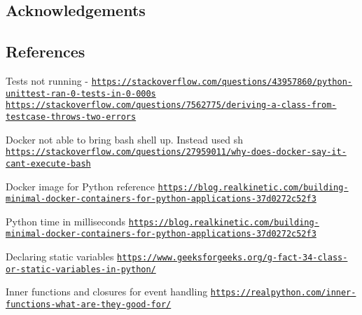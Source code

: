 \subsection*{Acknowledgements }

\subsection*{References }


\begin{DoxyEnumerate}
\item Tests not running -\/ \href{https://stackoverflow.com/questions/43957860/python-unittest-ran-0-tests-in-0-000s}{\tt https\+://stackoverflow.\+com/questions/43957860/python-\/unittest-\/ran-\/0-\/tests-\/in-\/0-\/000s} \href{https://stackoverflow.com/questions/7562775/deriving-a-class-from-testcase-throws-two-errors}{\tt https\+://stackoverflow.\+com/questions/7562775/deriving-\/a-\/class-\/from-\/testcase-\/throws-\/two-\/errors}
\item Docker not able to bring bash shell up. Instead used sh \href{https://stackoverflow.com/questions/27959011/why-does-docker-say-it-cant-execute-bash}{\tt https\+://stackoverflow.\+com/questions/27959011/why-\/does-\/docker-\/say-\/it-\/cant-\/execute-\/bash}
\item Docker image for Python reference \href{https://blog.realkinetic.com/building-minimal-docker-containers-for-python-applications-37d0272c52f3}{\tt https\+://blog.\+realkinetic.\+com/building-\/minimal-\/docker-\/containers-\/for-\/python-\/applications-\/37d0272c52f3}
\item Python time in milliseconds \href{https://blog.realkinetic.com/building-minimal-docker-containers-for-python-applications-37d0272c52f3}{\tt https\+://blog.\+realkinetic.\+com/building-\/minimal-\/docker-\/containers-\/for-\/python-\/applications-\/37d0272c52f3}
\item Declaring static variables \href{https://www.geeksforgeeks.org/g-fact-34-class-or-static-variables-in-python/}{\tt https\+://www.\+geeksforgeeks.\+org/g-\/fact-\/34-\/class-\/or-\/static-\/variables-\/in-\/python/}
\item Inner functions and closures for event handling \href{https://realpython.com/inner-functions-what-are-they-good-for/}{\tt https\+://realpython.\+com/inner-\/functions-\/what-\/are-\/they-\/good-\/for/} 
\end{DoxyEnumerate}